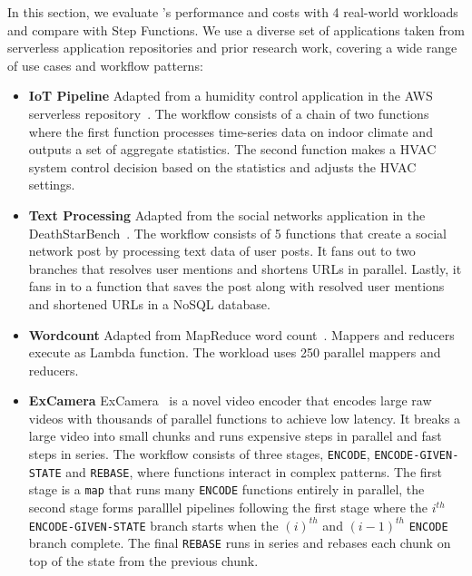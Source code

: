In this section, we evaluate \name{}'s performance and costs with 4 real-world
workloads and compare with Step Functions. We use a diverse set of
applications taken from serverless application repositories and prior research
work, covering a wide range of use cases and workflow patterns:

\begin{itemize}

  \item \textbf{IoT Pipeline} Adapted from a humidity control application in the
    AWS serverless repository~\cite{iot-pipeline}. The workflow consists of a
    chain of two functions where the first function processes time-series data
    on indoor climate and outputs a set of aggregate statistics. The second
    function makes a HVAC system control decision based on the statistics and
    adjusts the HVAC settings.

  \item \textbf{Text Processing} Adapted from the social networks application in
    the DeathStarBench~\cite{deathstar}. The workflow consists of 5 functions
    that create a social network post by processing text data of user posts.
    It fans out to two branches that resolves user mentions and shortens URLs
    in parallel. Lastly, it fans in to a function that saves the post along
    with resolved user mentions and shortened URLs in a NoSQL database.

    \item \textbf{Wordcount} Adapted from MapReduce word
    count~\cite{mapreduce}. Mappers and reducers execute as Lambda function.
    The workload uses 250 parallel mappers and reducers.

  \item \textbf{ExCamera} ExCamera~\cite{excamera} is a novel video encoder that
    encodes large raw videos with thousands of parallel functions to achieve
    low latency. It breaks a large video into small chunks and runs expensive
    steps in parallel and fast steps in series. The workflow consists of three
    stages, \texttt{ENCODE}, \texttt{ENCODE-GIVEN-STATE} and \texttt{REBASE},
    where functions interact in complex patterns. The first stage is a
    \texttt{map} that runs many \texttt{ENCODE} functions entirely in
    parallel, the second stage forms paralllel pipelines following the first
    stage where the $i^{th}$ \texttt{ENCODE-GIVEN-STATE} branch starts when
    the $(i)^{th}$ and $(i-1)^{th}$ \texttt{ENCODE} branch complete. The final
    \texttt{REBASE} runs in series and rebases each chunk on top of the state
    from the previous chunk.


\end{itemize}
